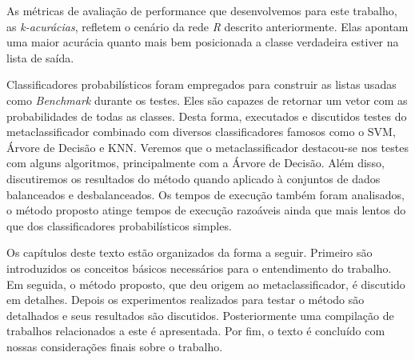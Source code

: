 As métricas de avaliação de performance que desenvolvemos para este trabalho, as \textit{k-acurácias}, refletem o cenário da rede \textit{R} descrito anteriormente.
Elas apontam uma maior acurácia quanto mais bem posicionada a classe verdadeira estiver na lista de saída.

Classificadores probabilísticos foram empregados para construir as listas usadas como \textit{Benchmark} durante os testes.
Eles são capazes de retornar um vetor com as probabilidades de todas as classes.
Desta forma, executados e discutidos testes do metaclassificador combinado com diversos classificadores famosos como o SVM, Árvore de Decisão e KNN.
Veremos que o metaclassificador destacou-se nos testes com alguns algoritmos, principalmente com a Árvore de Decisão.
Além disso, discutiremos os resultados do método quando aplicado à conjuntos de dados balanceados e desbalanceados.
Os tempos de execução também foram analisados, o método proposto atinge tempos de execução razoáveis ainda que mais lentos do que dos classificadores probabilísticos simples.

Os capítulos deste texto estão organizados da forma a seguir.
Primeiro são introduzidos os conceitos básicos necessários para o entendimento do trabalho.
Em seguida, o método proposto, que deu origem ao metaclassificador, é discutido em detalhes.
Depois os experimentos realizados para testar o método são detalhados e seus resultados são discutidos.
Posteriormente uma compilação de trabalhos relacionados a este é apresentada.
Por fim, o texto é concluído com nossas considerações finais sobre o trabalho.